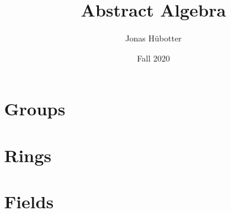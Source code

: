 \documentclass[nobib]{tufte-book}
\title{Abstract Algebra}
\author{Jonas Hübotter}
\date{Fall 2020}
\begin{document}
    \frontmatter

    \maketitle

    

    \tableofcontents

    \mainmatter

	\part{Groups}\label{cha:groups}
    
    
    
    
    
    
    
    
    \part{Rings}\label{cha:rings}
    
    
    
    
    
    
    
    
    \part{Fields}\label{cha:fields}
    
    
    
    
    
    
    
    

    \backmatter

    


    \begin{fullwidth}
    \printindex
    \end{fullwidth}
\end{document}
